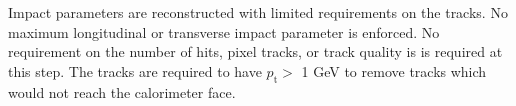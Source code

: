 Impact parameters are reconstructed with limited requirements on the tracks. No maximum longitudinal or transverse impact parameter
is enforced. No requirement on the number of hits, pixel tracks, or track quality is is required at this step. The tracks are required to have  $p_{\textrm{t}}>$ 1 GeV to remove tracks which would not reach the calorimeter face. 


